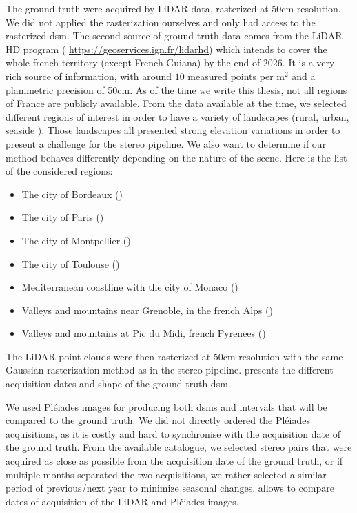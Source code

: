 The ground truth were acquired by LiDAR data, rasterized at 50cm resolution. We did not applied the rasterization ourselves and only had access to the rasterized \acrshort{dsm}. The second source of ground truth data comes from the LiDAR HD program (\cite{monnet_lidarhd_2023} \url{https://geoservices.ign.fr/lidarhd}) which intends to cover the whole french territory (except French Guiana) by the end of 2026. It is a very rich source of information, with around $10$ measured points per m$^2$ and a planimetric precision of 50cm. As of the time we write this thesis, not all regions of France are publicly available. From the data available at the time, we selected different regions of interest in order to have a variety of landscapes (rural, urban, seaside \etc). Those landscapes all presented strong elevation variations in order to present a challenge for the stereo pipeline. We also want to determine if our method behaves differently depending on the nature of the scene. Here is the list of the considered regions:
\begin{itemize}
    \item The city of Bordeaux ()
    \item The city of Paris ()
    \item The city of Montpellier ()
    \item The city of Toulouse ()
    \item Mediterranean coastline with the city of Monaco ()
    \item Valleys and mountains near Grenoble, in the french Alps ()
    \item Valleys and mountains at Pic du Midi, french Pyrenees ()
\end{itemize}
The LiDAR point clouds were then rasterized at 50cm resolution with the same Gaussian rasterization method as in the stereo pipeline.  presents the different acquisition dates and shape of the ground truth \acrshort{dsm}.

We used Pléiades images for producing both \acrshort{dsm}s and intervals that will be compared to the ground truth. We did not directly ordered the Pléiades acquisitions, as it is costly and hard to synchronise with the acquisition date of the ground truth. From the available catalogue, we selected stereo pairs that were acquired as close as possible from the acquisition date of the ground truth, or if multiple months separated the two acquisitions, we rather selected a similar period of previous/next year to minimize seasonal changes.  allows to compare dates of acquisition of the LiDAR and Pléiades images.

